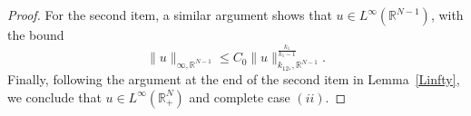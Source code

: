 \documentclass[10pt,a4paper]{amsart}
\begin{document}
\begin{proof}
For the second item, a similar argument shows that $u \in L^\infty(\mathds{R}^{N-1})$, with the bound
\begin{equation*}
\|u\|_{\infty,\mathds{R}^{N-1}}\leq C_0 \|u\|_{k_12_\ast,\mathds{R}^{N-1}}^{\frac{k_1}{k_1-1}}.
\end{equation*}
Finally, following the argument at the end of the second item in Lemma~\ref{Linfty}, we conclude that $u\in L^\infty(\mathds{R}^N_+)$ and complete case $(ii)$. 
\end{proof}
\end{document}
